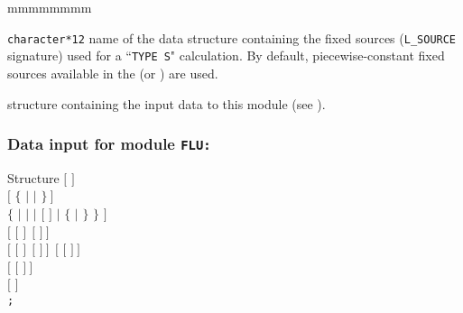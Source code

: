 \begin{ListeDeDescription}{mmmmmmmm}
\item[\dusa{SOUNAM}] {\tt character*12} name of the  data structure
containing the fixed sources ({\tt L\_SOURCE} signature) used for a ``{\tt TYPE S}" calculation.
By default, piecewise-constant fixed sources available in the  (or ) 
are used.

\item[\dstr{descflu}] structure containing the input data to this module (see
).

\end{ListeDeDescription}

\clearpage

\subsubsection{Data input for module {\tt FLU:}}\label{sect:descflu}

\begin{DataStructure}{Structure }
$[$   $]$ \\
$[$  $\{$  $|$  $|$  $\}~]$ \\
 $\{$  $|$  $|$  $|$  $[$  $]$ $|$ 
$\{$ $|$  $\}$  $\}$ $]$  \\
$[$  $[$  $]~~[$  $]~]$ \\
$[$  $[$  $]~~[$  $]~]~~[$  $[$  $]~]$ \\
$[$  $[$  $]~]$ \\
$[$     $]$ \\
{\tt ;}
\end{DataStructure}

